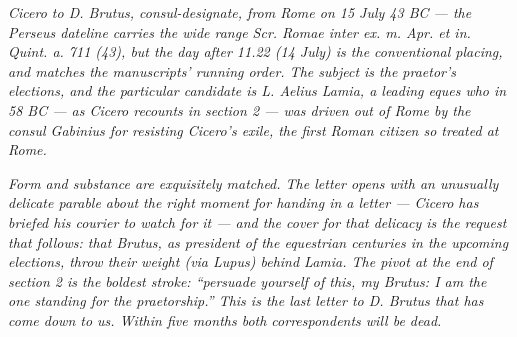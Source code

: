 
\textit{Cicero to D. Brutus, consul-designate, from Rome on
15 July 43 BC --- the Perseus dateline carries the wide
range \textit{Scr. Romae inter ex. m. Apr. et in. Quint. a.
711 (43)}, but the day after 11.22 (14 July) is the
conventional placing, and matches the manuscripts' running
order. The subject is the praetor's elections, and the
particular candidate is L. Aelius Lamia, a leading
\textit{eques} who in 58 BC --- as Cicero recounts in
section 2 --- was driven out of Rome by the consul Gabinius
for resisting Cicero's exile, the first Roman citizen so
treated at Rome.}

\textit{Form and substance are exquisitely matched. The
letter opens with an unusually delicate parable about the
right moment for handing in a letter --- Cicero has briefed
his courier to watch for it --- and the cover for that
delicacy is the request that follows: that Brutus, as
president of the equestrian centuries in the upcoming
elections, throw their weight (via Lupus) behind Lamia.
The pivot at the end of section 2 is the boldest stroke:
``persuade yourself of this, my Brutus: I am the one
standing for the praetorship.'' This is the last letter
to D. Brutus that has come down to us. Within five months
both correspondents will be dead.}
